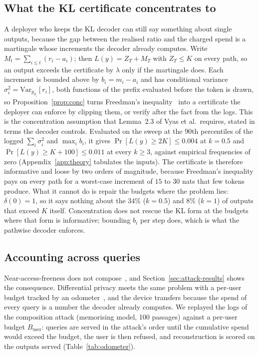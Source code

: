 \subsection{What the KL certificate concentrates to}\label{sec:concentration}
A deployer who keeps the KL decoder can still say something about single outputs, because the gap between the realised ratio and the charged spend is a martingale whose increments the decoder already computes. Write $M_t = \sum_{i \le t}(r_i - a_i)$; then $L(y) = Z_T + M_T$ with $Z_T \le K$ on every path, so an output exceeds the certificate by $\lambda$ only if the martingale does. Each increment is bounded above by $b_i = m_i - a_i$ and has conditional variance $\sigma_i^2 = \mathrm{Var}_{p_{\theta_i}}[r_i]$, both functions of the prefix evaluated before the token is drawn, so Proposition~\ref{prop:conc} turns Freedman's inequality~\cite{freedman1975tail,tropp2011freedman} into a certificate the deployer can enforce by clipping them, or verify after the fact from the logs. This is the concentration assumption that Lemma~2.3 of Vyas et al.\ requires, stated in terms the decoder controls. Evaluated on the sweep at the 90th percentiles of the logged $\sum_i \sigma_i^2$ and $\max_i b_i$, it gives $\Pr[L(y) \ge 2K] \le 0.004$ at $k=0.5$ and $\Pr[L(y) \ge K+100] \le 0.011$ at every $k \ge 3$, against empirical frequencies of zero (Appendix~\ref{app:theory} tabulates the inputs). The certificate is therefore informative and loose by two orders of magnitude, because Freedman's inequality pays on every path for a worst-case increment of $15$ to $30$ nats that few tokens produce. What it cannot do is repair the budgets where the problem lies: $\delta(0) = 1$, so it says nothing about the $34\%$ ($k=0.5$) and $8\%$ ($k=1$) of outputs that exceed $K$ itself. Concentration does not rescue the KL form at the budgets where that form is informative; bounding $b_i$ per step does, which is what the pathwise decoder enforces.

\subsection{Accounting across queries}\label{sec:odometer}
Near-access-freeness does not compose~\cite{cohen2025blameless}, and Section~\ref{sec:attack-results} shows the consequence. Differential privacy meets the same problem with a per-user budget tracked by an odometer~\cite{rogers2016odometers,whitehouse2023fully}, and the device transfers because the spend of every query is a number the decoder already computes. We replayed the logs of the composition attack (memorising model, 100 passages) against a per-user budget $B_{\mathrm{user}}$: queries are served in the attack's order until the cumulative spend would exceed the budget, the user is then refused, and reconstruction is scored on the outputs served (Table~\ref{tab:odometer}).

